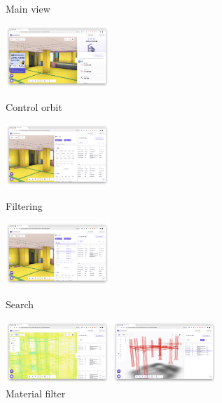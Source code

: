 \begin{itemize}[label=]
\begin{itemize}[label=]
\begin{figure}[!ht]
\begin{fullwidth}
{					            \caption*{Main view}
				            }\qquad
				            \parbox{0.35\textwidth}{
					            \centering
					            \includegraphics[width=0.35\textwidth]{images/builderhub-curation-control.png}
					            \caption*{Control orbit}
				            }
				            \parbox{0.35\textwidth}{
					            \centering
					            \includegraphics[width=0.35\textwidth]{images/builderhub-curation-filter.png}
					            \caption*{Filtering}
				            }\qquad
				            \parbox{0.35\textwidth}{
					            \centering
					            \includegraphics[width=0.35\textwidth]{images/builderhub-curation-filter-search.png}
					            \caption*{Search}
				            }\qquad
				            \parbox{0.35\textwidth}{
					            \centering
					            \includegraphics[width=0.35\textwidth]{images/builderhub-curation-filter-material.png}
					            \caption*{Material filter}
				            }\qquad
				            \parbox{0.35\textwidth}{
					            \centering
					            \includegraphics[width=0.35\textwidth]{images/builderhub-curation-filter-table.png}
}
\end{fullwidth}
\end{figure}
\end{itemize}
\end{itemize}
